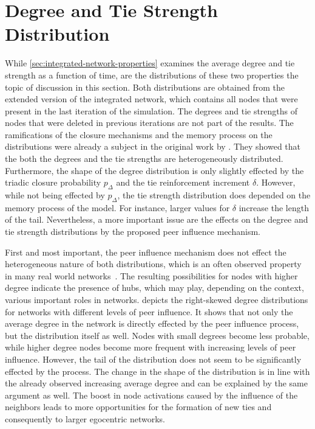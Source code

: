 

\section{Degree and Tie Strength Distribution}
\label{sec:weight-and-degree-distribution}

While \cref{sec:integrated-network-properties} examines the average degree and tie strength as a function of time, are the distributions of these two properties the topic of discussion in this section.
Both distributions are obtained from the extended version of the integrated network, which contains all nodes that were present in the last iteration of the simulation.
The degrees and tie strengths of nodes that were deleted in previous iterations are not part of the results.
The ramifications of the closure mechanisms and the memory process on the distributions were already a subject in the original work by \citet{Laurent2015}.
They showed that the both the degrees and the tie strengths are heterogeneously distributed.
Furthermore, the shape of the degree distribution is only slightly effected by the triadic closure probability \( p_{\Delta} \) and the tie reinforcement increment \( \delta \).
However, while not being effected by \( p_{\Delta} \), the tie strength distribution does depended on the memory process of the model.
For instance, larger values for \( \delta \) increase the length of the tail.
Nevertheless, a more important issue are the effects on the degree and tie strength distributions by the proposed peer influence mechanism.

First and most important, the peer influence mechanism does not effect the heterogeneous nature of both distributions, which is an often observed property in many real world networks~\cite{Barabasi2002, Karsai2014}.
The resulting possibilities for nodes with higher degree indicate the presence of hubs, which may play, depending on the context, various important roles in networks.
 depicts the right-skewed degree distributions for networks with different levels of peer influence.
It shows that not only the average degree in the network is directly effected by the peer influence process, but the distribution itself as well.
Nodes with small degrees become less probable, while higher degree nodes become more frequent with increasing levels of peer influence.
However, the tail of the distribution does not seem to be significantly effected by the process.
The change in the shape of the distribution is in line with the already observed increasing average degree and can be explained by the same argument as well.
The boost in node activations caused by the influence of the neighbors leads to more opportunities for the formation of new ties and consequently to larger egocentric networks.


